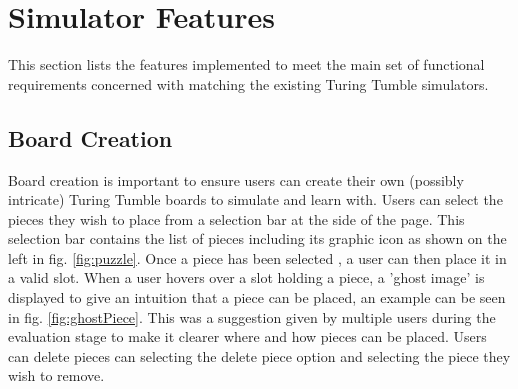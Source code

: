 \documentclass{l4proj}
\begin{document}


\section{Simulator Features}
This section lists the features implemented to meet the main set of functional requirements concerned with matching the existing Turing Tumble simulators.

\subsection{Board Creation}
Board creation is important to ensure users can create their own (possibly intricate) Turing Tumble boards to simulate and learn with. Users can select the pieces they wish to place from a selection bar at the side of the page. This selection bar contains the list of pieces including its graphic icon as shown on the left in fig. \ref{fig:puzzle}. Once a piece has been selected , a user can then place it in a valid slot. When a user hovers over a slot holding a piece, a 'ghost image' is displayed to give an intuition that a piece can be placed, an example can be seen in fig. \ref{fig:ghostPiece}. This was a suggestion given by multiple users during the evaluation stage to make it clearer where and how pieces can be placed. Users can delete pieces can selecting the delete piece option and selecting the piece they wish to remove.
\end{document}

